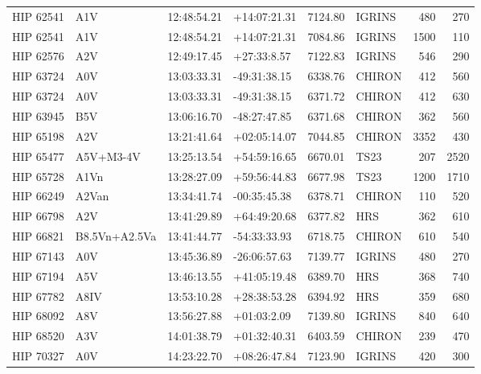 \documentclass{emulateapj}
\begin{document}
\begin{longtable*}{|l|lllrlrr|}
   HIP 62541 &            A1V &    12:48:54.21 &   +14:07:21.31 &  7124.80 &     IGRINS &      480 &     270 \\
   HIP 62541 &            A1V &    12:48:54.21 &   +14:07:21.31 &  7084.86 &     IGRINS &     1500 &     110 \\
   HIP 62576 &            A2V &    12:49:17.45 &    +27:33:8.57 &  7122.83 &     IGRINS &      546 &     290 \\
   HIP 63724 &            A0V &    13:03:33.31 &   -49:31:38.15 &  6338.76 &     CHIRON &      412 &     560 \\
   HIP 63724 &            A0V &    13:03:33.31 &   -49:31:38.15 &  6371.72 &     CHIRON &      412 &     630 \\
   HIP 63945 &            B5V &    13:06:16.70 &   -48:27:47.85 &  6371.68 &     CHIRON &      362 &     560 \\
   HIP 65198 &            A2V &    13:21:41.64 &   +02:05:14.07 &  7044.85 &     CHIRON &     3352 &     430 \\
   HIP 65477 &      A5V+M3-4V &    13:25:13.54 &   +54:59:16.65 &  6670.01 &       TS23 &      207 &    2520 \\
   HIP 65728 &           A1Vn &    13:28:27.09 &   +59:56:44.83 &  6677.98 &       TS23 &     1200 &    1710 \\
   HIP 66249 &          A2Van &    13:34:41.74 &   -00:35:45.38 &  6378.71 &     CHIRON &      110 &     520 \\
   HIP 66798 &            A2V &    13:41:29.89 &   +64:49:20.68 &  6377.82 &        HRS &      362 &     610 \\
   HIP 66821 &  B8.5Vn+A2.5Va &    13:41:44.77 &   -54:33:33.93 &  6718.75 &     CHIRON &      610 &     540 \\
   HIP 67143 &            A0V &    13:45:36.89 &   -26:06:57.63 &  7139.77 &     IGRINS &      480 &     270 \\
   HIP 67194 &            A5V &    13:46:13.55 &   +41:05:19.48 &  6389.70 &        HRS &      368 &     740 \\
   HIP 67782 &           A8IV &    13:53:10.28 &   +28:38:53.28 &  6394.92 &        HRS &      359 &     680 \\
   HIP 68092 &            A8V &    13:56:27.88 &    +01:03:2.09 &  7139.80 &     IGRINS &      840 &     640 \\
   HIP 68520 &            A3V &    14:01:38.79 &   +01:32:40.31 &  6403.59 &     CHIRON &      239 &     470 \\
   HIP 70327 &            A0V &    14:23:22.70 &   +08:26:47.84 &  7123.90 &     IGRINS &      420 &     300 \\

\end{longtable*}
\end{document}

